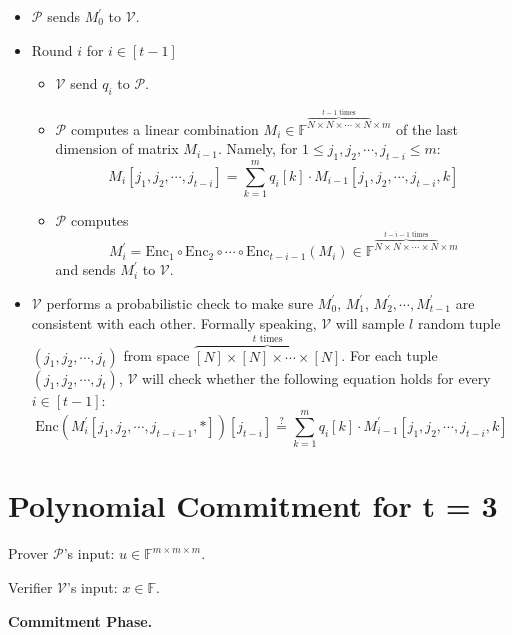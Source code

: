 \begin{itemize}
    \item $\mathcal{P}$ sends $M_0^{\prime}$ to $\mathcal{V}$.
    
    \item Round $i$ for $i \in [t-1]$
    
    \begin{itemize}
        \item $\mathcal{V}$ send $q_i$ to $\mathcal{P}$.
        \item $\mathcal{P}$ computes a linear combination 
        $M_i \in \mathbb{F}^{\overbrace{N \times N \times \cdots \times N}^{t-1 \text{ times}} \times m}$ of the last dimension of matrix $M_{i-1}$.
        Namely, for $1 \le j_1,j_2, \cdots, j_{t-i} \le m$:
$$
    M_i[j_1,j_2, \cdots, j_{t-i}] = \sum_{k=1}^{m} q_{i}[k] \cdot M_{i-1}[j_1,j_2, \cdots, j_{t-i}, k]
$$

        \item $\mathcal{P}$ computes 
$$
    M_i^\prime = \text{Enc}_1 \circ \text{Enc}_2 \circ \cdots \circ \text{Enc}_{t - i - 1}(M_i)\in \mathbb{F}^{\overbrace{N \times N \times \cdots \times N}^{t-i-1 \text{ times}} \times m}
$$    
        and sends $M_i^\prime$ to $\mathcal{V}$.
    \end{itemize}
    
    \item $\mathcal{V}$ performs a probabilistic check to make sure $M_0^\prime$, $M_1^\prime$, $M_2^\prime, \cdots, M_{t-1}^\prime$ are consistent with each other. Formally speaking, $\mathcal{V}$ will sample $l$ random tuple $(j_1, j_2, \cdots, j_t)$ from space $\overbrace{[N] \times [N] \times \cdots \times [N]}^{t \text{ times}}$. 
    For each tuple $(j_1, j_2, \cdots, j_t)$, 
    $\mathcal{V}$ will check whether the following equation holds for every $i \in [t-1]$:
$$
    \text{Enc}(M_i^\prime[j_1, j_2, \cdots, j_{t-i-1}, *])[j_{t-i}] \stackrel{?}{=} \sum_{k=1}^m q_i[k] \cdot M_{i-1}^{\prime}[j_1,j_2, \cdots, j_{t-i},k]
$$
\end{itemize}

\section{Polynomial Commitment for t = 3}

Prover $\mathcal{P}$'s input: $u \in \mathbb{F}^{m \times m \times m}$.

Verifier $\mathcal{V}$'s input: $x \in \mathbb{F}$.

\textbf{Commitment Phase.}

